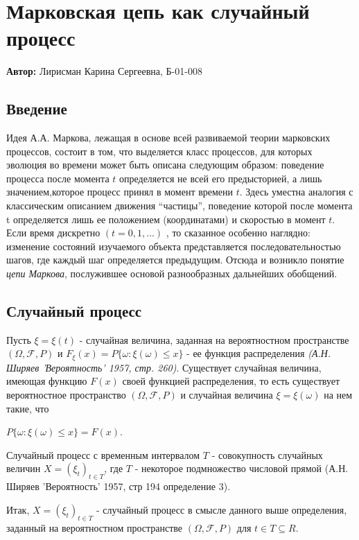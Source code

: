 
\section{Марковская цепь как случайный процесс}

\textbf{Автор:} Лирисман Карина Сергеевна, Б-01-008

\subsection{Введение}

	Идея А.А. Маркова, лежащая в основе всей развиваемой теории марковских процессов, состоит в том, что выделяется класс процессов, для которых эволюция во времени может быть описана следующим образом: поведение процесса после момента $t$ определяется не всей его предысторией, а лишь значением,которое процесс принял в момент времени $t$. Здесь уместна аналогия с классическим описанием движения “частицы”, поведение которой после момента t опре­деляется лишь ее положением (координатами) и скоростью в момент $t$. Если время дискретно $(t = 0, 1,...)$ , то сказанное особенно наглядно: изменение состояний изучаемого объекта представляется последовательностью шагов, где каждый шаг
определяется предыдущим. Отсюда и возникло понятие \textit{цепи Маркова}, послужив­шее основой разнообразных дальнейших обобщений.


\subsection{Случайный процесс}
Пусть $\xi = \xi (t)$ - случайная величина, заданная на вероятностном пространстве $(\Omega , \mathscr{F}, P)$ и $F_{\xi} (x) = P \lbrace \omega : \xi (\omega) \leq x \rbrace$ - ее функция распределения \textit{(А.Н. Ширяев 'Вероятность'  1957, стр. 260)}. Существует случайная величина, имеющая функцию $F(x)$ своей функцией распределения, то есть существует вероятностное пространство $(\Omega , \mathscr{F}, P)$ и случайная величина $\xi = \xi (\omega)$ на нем такие, что 
\begin{center}
$P \lbrace \omega : \xi (\omega) \leq x \rbrace = F(x)$.
\end{center}

Случайный процесс с временным интервалом $T$ - совокупность случайных величин $X = (\xi_{t})_{t \in T }$, где $T$ - некоторое подмножество числовой прямой (А.Н. Ширяев 'Вероятность' 1957, стр 194 определение 3).

Итак, $X = (\xi_{t})_{t \in T }$ - случайный процесс в смысле данного выше определения, заданный на вероятностном пространстве $(\Omega , \mathscr{F}, P)$ для $t \in T \subseteq R$.

